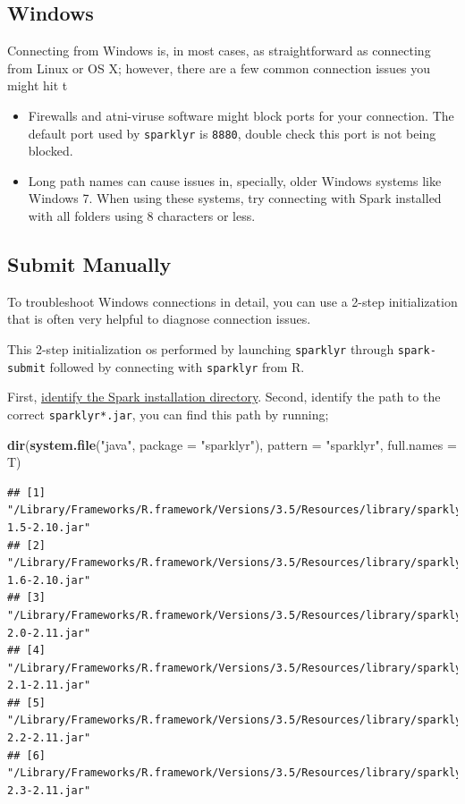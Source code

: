 \documentclass[]{book}
\newenvironment{Shaded}{\begin{snugshade}}{\end{snugshade}}
\newcommand{\DataTypeTok}[1]{\textcolor[rgb]{0.13,0.29,0.53}{#1}}
\newcommand{\KeywordTok}[1]{\textcolor[rgb]{0.13,0.29,0.53}{\textbf{#1}}}
\newcommand{\NormalTok}[1]{#1}
\newcommand{\StringTok}[1]{\textcolor[rgb]{0.31,0.60,0.02}{#1}}
\providecommand{\tightlist}{%
  \setlength{\itemsep}{0pt}\setlength{\parskip}{0pt}}
\theoremstyle{definition}
\theoremstyle{definition}
\theoremstyle{definition}
\theoremstyle{remark}
\begin{document}
\hypertarget{windows}{%
\subsection{Windows}\label{windows}}

Connecting from Windows is, in most cases, as straightforward as
connecting from Linux or OS X; however, there are a few common
connection issues you might hit t

\begin{itemize}
\tightlist
\item
  Firewalls and atni-viruse software might block ports for your
  connection. The default port used by \texttt{sparklyr} is
  \texttt{8880}, double check this port is not being blocked.
\item
  Long path names can cause issues in, specially, older Windows systems
  like Windows 7. When using these systems, try connecting with Spark
  installed with all folders using 8 characters or less.
\end{itemize}

\hypertarget{submit-manually}{%
\subsection{Submit Manually}\label{submit-manually}}

To troubleshoot Windows connections in detail, you can use a 2-step
initialization that is often very helpful to diagnose connection issues.

This 2-step initialization os performed by launching \texttt{sparklyr}
through \texttt{spark-submit} followed by connecting with
\texttt{sparklyr} from R.

First, \href{troubleshoot-spark-submit}{identify the Spark installation
directory}. Second, identify the path to the correct
\texttt{sparklyr*.jar}, you can find this path by running;

\begin{Shaded}
\begin{Highlighting}[]
\KeywordTok{dir}\NormalTok{(}\KeywordTok{system.file}\NormalTok{(}\StringTok{"java"}\NormalTok{, }\DataTypeTok{package =} \StringTok{"sparklyr"}\NormalTok{), }\DataTypeTok{pattern =} \StringTok{"sparklyr"}\NormalTok{, }\DataTypeTok{full.names =}\NormalTok{ T)}
\end{Highlighting}
\end{Shaded}

\begin{verbatim}
## [1] "/Library/Frameworks/R.framework/Versions/3.5/Resources/library/sparklyr/java/sparklyr-1.5-2.10.jar"
## [2] "/Library/Frameworks/R.framework/Versions/3.5/Resources/library/sparklyr/java/sparklyr-1.6-2.10.jar"
## [3] "/Library/Frameworks/R.framework/Versions/3.5/Resources/library/sparklyr/java/sparklyr-2.0-2.11.jar"
## [4] "/Library/Frameworks/R.framework/Versions/3.5/Resources/library/sparklyr/java/sparklyr-2.1-2.11.jar"
## [5] "/Library/Frameworks/R.framework/Versions/3.5/Resources/library/sparklyr/java/sparklyr-2.2-2.11.jar"
## [6] "/Library/Frameworks/R.framework/Versions/3.5/Resources/library/sparklyr/java/sparklyr-2.3-2.11.jar"
\end{verbatim}
\end{document}
